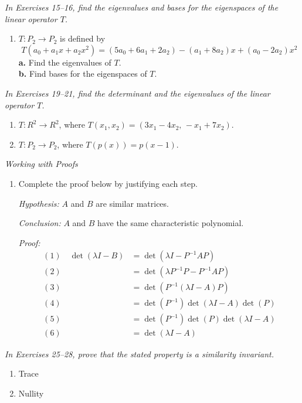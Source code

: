 \documentclass{article}
\begin{document}
\noindent\textit{In Exercises 15--16, find the eigenvalues and bases for the eigenspaces
of the linear operator $T$.}

\begin{enumerate}
  \item[15.] $T : P_2 \to P_2$ is defined by
        \[
          T(a_0+a_1x+a_2x^2)
          = (5a_0+6a_1+2a_2) - (a_1+8a_2)x + (a_0-2a_2)x^2
        \]
        \textbf{a.} Find the eigenvalues of $T$.\\
        \textbf{b.} Find bases for the eigenspaces of $T$.

\end{enumerate}

\noindent\textit{In Exercises 19--21, find the determinant and the eigenvalues of the
linear operator $T$.}

\begin{enumerate}
  \item[19.] $T : R^2 \to R^2$, where $T(x_1,x_2) = (3x_1-4x_2,\,-x_1+7x_2)$.

  \item[21.] $T : P_2 \to P_2$, where $T(p(x)) = p(x-1)$.

\end{enumerate}

\noindent\textit{Working with Proofs}

\begin{enumerate}
  \item[23.] Complete the proof below by justifying each step.

        \textit{Hypothesis:} $A$ and $B$ are similar matrices.

        \textit{Conclusion:} $A$ and $B$ have the same characteristic polynomial.

        \textit{Proof:}
        \begin{align*}
          (1)\quad\det(\lambda I - B) &= \det(\lambda I - P^{-1}AP)\\
          (2)\quad &= \det(\lambda P^{-1}P - P^{-1}AP)\\
          (3)\quad &= \det(P^{-1}(\lambda I - A)P)\\
          (4)\quad &= \det(P^{-1})\det(\lambda I - A)\det(P)\\
          (5)\quad &= \det(P^{-1})\det(P)\det(\lambda I - A)\\
          (6)\quad &= \det(\lambda I - A)
        \end{align*}

\end{enumerate}

\noindent\textit{In Exercises 25--28, prove that the stated property is a similarity
invariant.}

\begin{enumerate}
  \item[25.] Trace
  \item[27.] Nullity
\end{enumerate}
\end{document}
